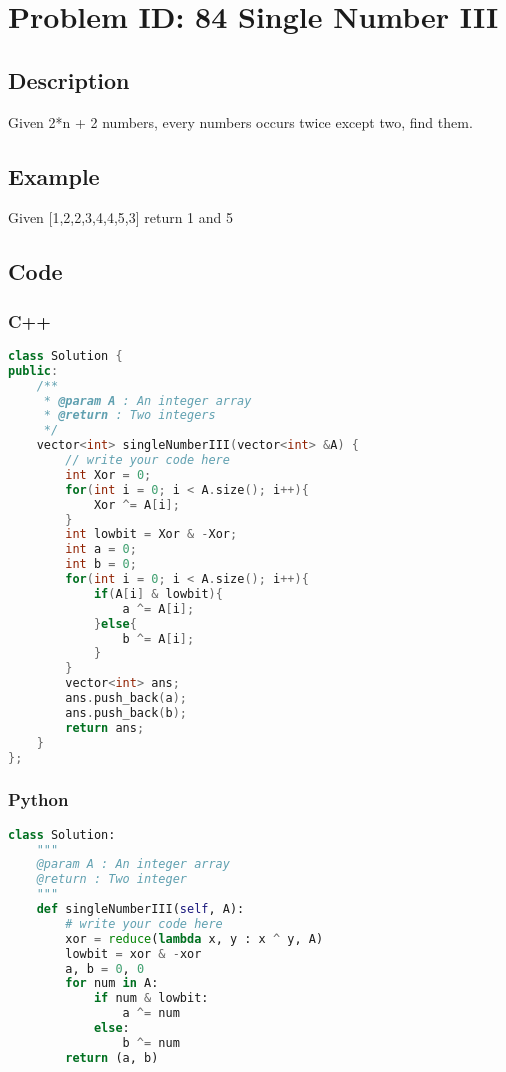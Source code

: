 \section{Problem ID: 84 Single Number III}
\subsection{Description}
Given 2*n + 2 numbers, every numbers occurs twice except two, find them.

\subsection{Example}
Given [1,2,2,3,4,4,5,3] return 1 and 5

\subsection{Code}
\scriptsize
\subsubsection{C++}
\begin{lstlisting}[language=C++]
class Solution {
public:
    /**
     * @param A : An integer array
     * @return : Two integers
     */
    vector<int> singleNumberIII(vector<int> &A) {
        // write your code here
        int Xor = 0;
        for(int i = 0; i < A.size(); i++){
            Xor ^= A[i];
        }
        int lowbit = Xor & -Xor;
        int a = 0;
        int b = 0;
        for(int i = 0; i < A.size(); i++){
            if(A[i] & lowbit){
                a ^= A[i];
            }else{
                b ^= A[i];
            }
        }
        vector<int> ans;
        ans.push_back(a);
        ans.push_back(b);
        return ans;
    }
};
\end{lstlisting}

\subsubsection{Python}
\begin{lstlisting}[language=Python]
class Solution:
    """
    @param A : An integer array
    @return : Two integer
    """
    def singleNumberIII(self, A):
        # write your code here
        xor = reduce(lambda x, y : x ^ y, A)
        lowbit = xor & -xor
        a, b = 0, 0
        for num in A:
            if num & lowbit:
                a ^= num
            else:
                b ^= num
        return (a, b)
\end{lstlisting}
\normalsize 